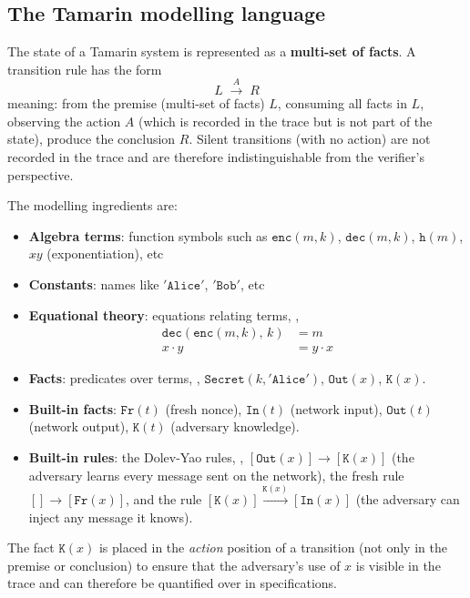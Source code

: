 \documentclass[oneside]{academica}
\begin{document}
\subsection{The Tamarin modelling language}

The state of a Tamarin system is represented as a \textbf{multi-set of facts}. A transition rule has the form
\begin{equation*}
  L \;\xrightarrow{A}\; R
\end{equation*}
meaning: from the premise (multi-set of facts) $L$, consuming all facts in $L$, observing the action $A$ (which is recorded in the trace but is not part of the state), produce the conclusion $R$.
Silent transitions (with no action) are not recorded in the trace and are therefore indistinguishable from the verifier's perspective.

The modelling ingredients are:

\begin{itemize}
  \item \textbf{Algebra terms}: function symbols such as $\mathtt{enc}(m, k)$, $\mathtt{dec}(m, k)$, $\mathtt{h}(m)$, $x \mathbin{\hat{}} y$ (exponentiation), etc
  \item \textbf{Constants}: names like $\mathtt{'Alice'}$, $\mathtt{'Bob'}$, etc
  \item \textbf{Equational theory}: equations relating terms, \eg,
    \begin{align*}
      \mathtt{dec}(\mathtt{enc}(m, k),\, k) &= m \\
      x \cdot y &= y \cdot x
    \end{align*}
  \item \textbf{Facts}: predicates over terms, \eg, $\mathtt{Secret}(k, \mathtt{'Alice'})$, $\mathtt{Out}(x)$, $\mathtt{K}(x)$.
  \item \textbf{Built-in facts}: $\mathtt{Fr}(t)$ (fresh nonce), $\mathtt{In}(t)$ (network input), $\mathtt{Out}(t)$ (network output), $\mathtt{K}(t)$ (adversary knowledge).
  \item \textbf{Built-in rules}: the Dolev-Yao rules, \eg, $[\mathtt{Out}(x)] \to [\mathtt{K}(x)]$ (the adversary learns every message sent on the network), the fresh rule $[] \to [\mathtt{Fr}(x)]$, and the rule $[\mathtt{K}(x)] \xrightarrow{\mathtt{K}(x)} [\mathtt{In}(x)]$ (the adversary can inject any message it knows).
\end{itemize}

\begin{note}
  The fact $\mathtt{K}(x)$ is placed in the \emph{action} position of a transition (not only in the premise or conclusion) to ensure that the adversary's use of $x$ is visible in the trace and can therefore be quantified over in specifications.
\end{note}
\end{document}
